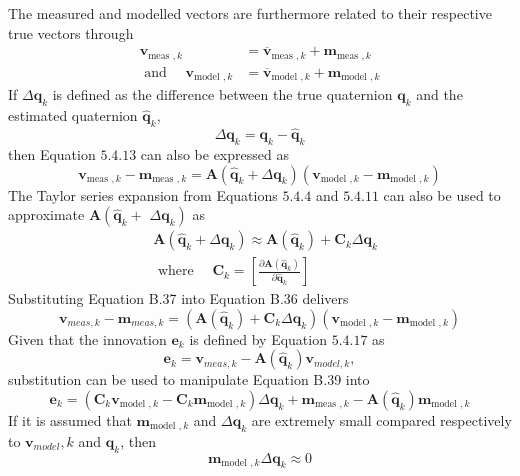 The measured and modelled vectors are furthermore related to their respective true vectors through
$$
\begin{aligned}
\mathbf{v}_{\text {meas }, k} &=\overline{\mathbf{v}}_{\text {meas }, k}+\mathbf{m}_{\text {meas }, k} \\
\text { and } \quad \mathbf{v}_{\text {model }, k} &=\overline{\mathbf{v}}_{\text {model }, k}+\mathbf{m}_{\text {model }, k}
\end{aligned}
$$
If $\Delta \mathbf{q}_{k}$ is defined as the difference between the true quaternion $\mathbf{q}_{k}$ and the estimated quaternion $\hat{\mathbf{q}}_{k}$,
$$
\Delta \mathbf{q}_{k}=\mathbf{q}_{k}-\hat{\mathbf{q}}_{k}
$$
then Equation $5.4 .13$ can also be expressed as
$$
\mathbf{v}_{\text {meas }, k}-\mathbf{m}_{\text {meas }, k}=\mathbf{A}\left(\hat{\mathbf{q}}_{k}+\Delta \mathbf{q}_{k}\right)\left(\mathbf{v}_{\text {model }, k}-\mathbf{m}_{\text {model }, k}\right)
$$
The Taylor series expansion from Equations $5.4 .4$ and $5.4 .11$ can also be used to approximate $\mathbf{A}\left(\hat{\mathbf{q}}_{k}+\right.$ $\left.\Delta \mathbf{q}_{k}\right)$ as
$$
\begin{aligned}
&\mathbf{A}\left(\hat{\mathbf{q}}_{k}+\Delta \mathbf{q}_{k}\right) \approx \mathbf{A}\left(\hat{\mathbf{q}}_{k}\right)+\mathbf{C}_{k} \Delta \mathbf{q}_{k} \\
&\text { where } \quad \mathbf{C}_{k}=\left[\frac{\partial \mathbf{A}\left(\hat{\mathbf{q}}_{k}\right)}{\partial \hat{\mathbf{q}}_{k}}\right]
\end{aligned}
$$
Substituting Equation B.37 into Equation B.36 delivers
$$
\mathbf{v}_{m e a s, k}-\mathbf{m}_{m e a s, k}=\left(\mathbf{A}\left(\hat{\mathbf{q}}_{k}\right)+\mathbf{C}_{k} \Delta \mathbf{q}_{k}\right)\left(\mathbf{v}_{\text {model }, k}-\mathbf{m}_{\text {model }, k}\right)
$$
Given that the innovation $\mathbf{e}_{k}$ is defined by Equation $5.4 .17$ as
$$
\mathbf{e}_{k}=\mathbf{v}_{m e a s, k}-\mathbf{A}\left(\hat{\mathbf{q}}_{k}\right) \mathbf{v}_{m o d e l, k},
$$
substitution can be used to manipulate Equation B.39 into
$$
\mathbf{e}_{k}=\left(\mathbf{C}_{k} \mathbf{v}_{\text {model }, k}-\mathbf{C}_{k} \mathbf{m}_{\text {model }, k}\right) \Delta \mathbf{q}_{k}+\mathbf{m}_{\text {meas }, k}-\mathbf{A}\left(\hat{\mathbf{q}}_{k}\right) \mathbf{m}_{\text {model }, k}
$$
If it is assumed that $\mathbf{m}_{\text {model }, k}$ and $\Delta \mathbf{q}_{k}$ are extremely small compared respectively to $\mathbf{v}_{m o d e l}, k$ and $\mathbf{q}_{k}$, then
$$
\mathbf{m}_{\text {model }, k} \Delta \mathbf{q}_{k} \approx 0
$$
